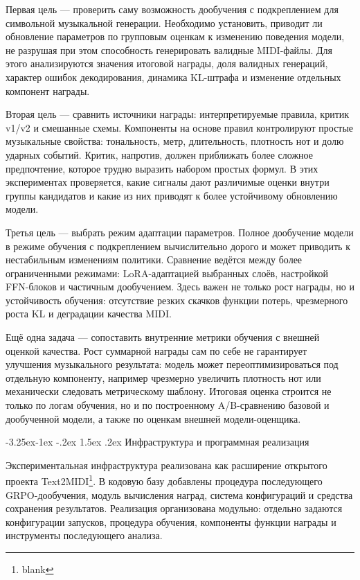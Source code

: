 \documentclass[a4paper,12pt]{extarticle}
\makeatletter
\renewcommand\subsection{\@startsection{subsection}{2}{\z@}%
  {-3.25ex\@plus -1ex \@minus -.2ex}%
  {1.5ex \@plus .2ex}%
  {\normalfont\large\bfseries\Needspace{6\baselineskip}}}
\makeatother
\begin{document}
Первая цель --- проверить саму возможность дообучения с подкреплением
для символьной музыкальной генерации. Необходимо установить, приводит ли
обновление параметров по групповым оценкам к изменению поведения модели,
не разрушая при этом способность генерировать валидные MIDI-файлы. Для
этого анализируются значения итоговой награды, доля
валидных генераций, характер ошибок декодирования, динамика KL-штрафа и
изменение отдельных компонент награды.

Вторая цель --- сравнить источники награды: интерпретируемые правила,
критик v1/v2 и смешанные схемы. Компоненты на основе правил
контролируют простые
музыкальные свойства: тональность, метр, длительность, плотность нот и
долю ударных событий. Критик, напротив, должен приближать более сложное
предпочтение, которое трудно выразить набором простых формул. В этих
экспериментах проверяется, какие сигналы дают различимые оценки
внутри группы кандидатов и какие из них приводят к более устойчивому
обновлению модели.

Третья цель --- выбрать режим адаптации параметров. Полное дообучение модели
в режиме обучения с подкреплением вычислительно дорого и может приводить к
нестабильным изменениям политики. Сравнение ведётся между более ограниченными
режимами: LoRA-адаптацией выбранных слоёв, настройкой FFN-блоков и частичным
дообучением. Здесь важен не только рост награды, но и устойчивость обучения:
отсутствие резких скачков функции потерь, чрезмерного роста KL и деградации
качества MIDI.

Ещё одна задача --- сопоставить внутренние метрики обучения с внешней оценкой
качества. Рост суммарной награды сам по себе
не гарантирует улучшения музыкального результата: модель может
переоптимизироваться под отдельную компоненту, например чрезмерно
увеличить плотность нот или механически следовать метрическому шаблону.
Итоговая оценка строится не только по логам обучения, но и по
построенному A/B-сравнению базовой и дообученной модели, а также по
оценкам внешней модели-оценщика.

\subsection{Инфраструктура и программная реализация}

Экспериментальная инфраструктура реализована как расширение открытого проекта
Text2MIDI\footnote{blank}. В кодовую базу добавлены процедура последующего
GRPO-дообучения, модуль вычисления наград, система конфигураций и средства
сохранения результатов. Реализация организована модульно: отдельно задаются
конфигурации запусков, процедура обучения, компоненты функции награды и
инструменты последующего анализа.
\end{document}
